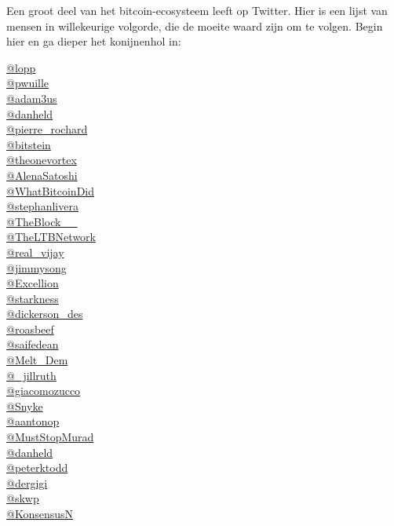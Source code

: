 \documentclass[smalldemyvopaper,11pt,twoside,onecolumn,openright,extrafontsizes]{memoir}
\begin{document}
Een groot deel van het bitcoin-ecosysteem leeft op Twitter. Hier is een lijst van mensen in willekeurige volgorde, die de moeite waard zijn om te volgen. Begin hier en ga dieper het konijnenhol in:

\newpage

\noindent\href{https://twitter.com/lopp}{@lopp}
\\\noindent\href{https://twitter.com/pwuille}{@pwuille}
\\\noindent\href{https://twitter.com/adam3us}{@adam3us}
\\\noindent\href{https://twitter.com/danheld}{@danheld}
\\\noindent\href{https://twitter.com/pierre\_rochard}{@pierre\_rochard}
\\\noindent\href{https://twitter.com/bitstein}{@bitstein}
\\\noindent\href{https://twitter.com/theonevortex}{@theonevortex}
\\\noindent\href{https://twitter.com/AlenaSatoshi}{@AlenaSatoshi}
\\\noindent\href{https://twitter.com/WhatBitcoinDid}{@WhatBitcoinDid}
\\\noindent\href{https://twitter.com/stephanlivera}{@stephanlivera}
\\\noindent\href{https://twitter.com/TheBlock\_\_}{@TheBlock\_\_}
\\\noindent\href{https://twitter.com/TheLTBNetwork}{@TheLTBNetwork}
\\\noindent\href{https://twitter.com/real\_vijay}{@real\_vijay}
\\\noindent\href{https://twitter.com/jimmysong}{@jimmysong}
\\\noindent\href{https://twitter.com/Excellion}{@Excellion}
\\\noindent\href{https://twitter.com/starkness}{@starkness}
\\\noindent\href{https://twitter.com/dickerson\_des}{@dickerson\_des}
\\\noindent\href{https://twitter.com/roasbeef}{@roasbeef}
\\\noindent\href{https://twitter.com/saifedean}{@saifedean}
\\\noindent\href{https://twitter.com/Melt\_Dem}{@Melt\_Dem}
\\\noindent\href{https://twitter.com/\_jillruth}{@\_jillruth}
\\\noindent\href{https://twitter.com/giacomozucco}{@giacomozucco}
\\\noindent\href{https://twitter.com/Snyke}{@Snyke}
\\\noindent\href{https://twitter.com/aantonop}{@aantonop}
\\\noindent\href{https://twitter.com/MustStopMurad}{@MustStopMurad}
\\\noindent\href{https://twitter.com/danheld}{@danheld}
\\\noindent\href{https://twitter.com/peterktodd}{@peterktodd}
\\\noindent\href{https://twitter.com/dergigi}{@dergigi}
\\\noindent\href{https://twitter.com/skwp}{@skwp}
\\\noindent\href{https://twitter.com/konsensusn}{@KonsensusN}
\end{document}
